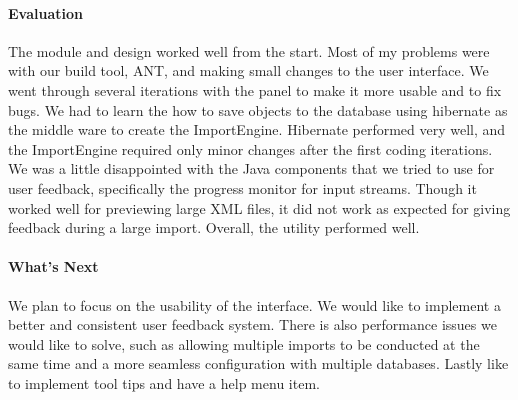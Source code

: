 \paragraph{Evaluation}
The module and design worked well from the start. Most of my problems were with our build tool, ANT, and making small changes to the user interface. We went through several iterations with the panel to make it more usable and to fix bugs. We had to learn the how to save objects to the database using hibernate as the middle ware to create the ImportEngine. Hibernate performed very well, and the ImportEngine required only minor changes after the first coding iterations. We was a little disappointed with the Java components that we tried to use for user feedback, specifically the progress monitor for input streams. Though it worked well for previewing large XML files, it did not work as expected for giving feedback during a large import. Overall, the utility performed well. 

\paragraph{What's Next}
We plan to focus on the usability of the interface. We would like to implement a better and consistent user feedback system. There is also performance issues we would like to solve, such as allowing multiple imports to be conducted at the same time and a more seamless configuration with multiple databases. Lastly like to implement tool tips and have a help menu item. 

